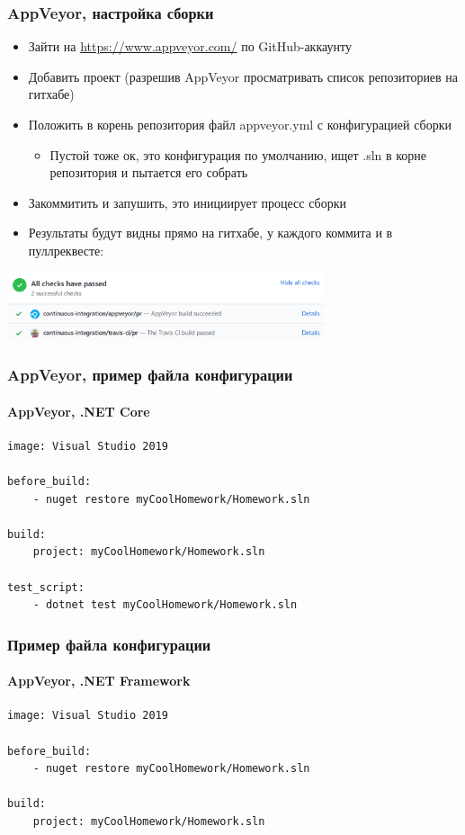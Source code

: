 \documentclass[xetex,mathserif,serif]{beamer}
\begin{document}
	\begin{frame}
		\frametitle{AppVeyor, настройка сборки}
		\begin{itemize}
			\item Зайти на \url{https://www.appveyor.com/} по GitHub-аккаунту
			\item Добавить проект (разрешив AppVeyor просматривать список репозиториев на гитхабе)
			\item Положить в корень репозитория файл appveyor.yml с конфигурацией сборки
			\begin{itemize}
				\item Пустой тоже ок, это конфигурация по умолчанию, ищет .sln в корне репозитория и пытается его собрать
			\end{itemize}
			\item Закоммитить и запушить, это инициирует процесс сборки
			\item Результаты будут видны прямо на гитхабе, у каждого коммита и в пуллреквесте:
		\end{itemize}
		\begin{center}
			\includegraphics[width=0.7\textwidth]{appVeyorSuccess.png}
		\end{center}
	\end{frame}

	\begin{frame}[fragile]
		\frametitle{AppVeyor, пример файла конфигурации}
		\framesubtitle{AppVeyor, .NET Core}
		\begin{verbatim}
image: Visual Studio 2019

before_build: 
    - nuget restore myCoolHomework/Homework.sln

build: 
    project: myCoolHomework/Homework.sln

test_script: 
    - dotnet test myCoolHomework/Homework.sln
		\end{verbatim}
	\end{frame}

	\begin{frame}[fragile]
		\frametitle{Пример файла конфигурации}
		\framesubtitle{AppVeyor, .NET Framework}
		\begin{verbatim}
image: Visual Studio 2019

before_build: 
    - nuget restore myCoolHomework/Homework.sln

build: 
    project: myCoolHomework/Homework.sln
		\end{verbatim}
	\end{frame}
\end{document}
